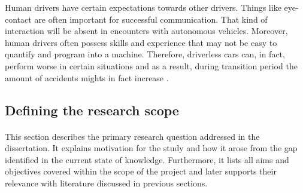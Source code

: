 \documentclass[11pt,english]{article}
\begin{document}
\par
Human drivers have certain expectations towards other drivers. Things like eye-contact are often important for successful communication. That kind of interaction will be absent in encounters with autonomous vehicles. Moreover, human drivers often possess skills and experience that may not be easy to quantify and program into a machine. Therefore, driverless cars can, in fact, perform worse in certain situations and as a result, during transition period the amount of accidents mights in fact increase \citep{sivak2015road}.





















\subsection{Defining the research scope}

\paragraph{}
This section describes the primary research question addressed in the dissertation. It explains motivation for the study and how it arose from the gap identified in the current state of knowledge. Furthermore, it lists all aims and objectives covered within the scope of the project and later supports their relevance with literature discussed in previous sections.
\end{document}
